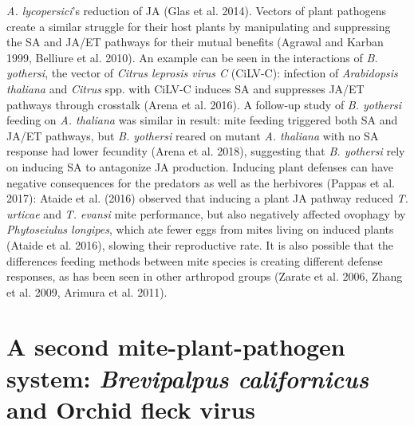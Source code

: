 \documentclass[12pt,final,CPage]{ufthesis}
\begin{document}
{\emph{A. lycopersici}'s reduction of JA (Glas et al. 2014). Vectors of plant pathogens create a similar struggle for their host plants by manipulating and suppressing the SA and JA/ET pathways for their mutual benefits (Agrawal and Karban 1999, Belliure et al. 2010). An example can be seen in the interactions of \emph{B. yothersi}, the vector of \emph{Citrus leprosis virus C} (CiLV-C): infection of \emph{Arabidopsis thaliana} and \emph{Citrus} spp. with CiLV-C induces SA and suppresses JA/ET pathways through crosstalk (Arena et al. 2016). A follow-up study of \emph{B. yothersi} feeding on \emph{A. thaliana} was similar in result: mite feeding triggered both SA and JA/ET pathways, but \emph{B. yothersi} reared on mutant \emph{A. thaliana} with no SA response had lower fecundity (Arena et al. 2018), suggesting that \emph{B. yothersi} rely on inducing SA to antagonize JA production. Inducing plant defenses can have negative consequences for the predators as well as the herbivores (Pappas et al. 2017): Ataide et al. (2016) observed that inducing a plant JA pathway reduced \emph{T. urticae} and \emph{T. evansi} mite performance, but also negatively affected ovophagy by \emph{Phytoseiulus longipes}, which ate fewer eggs from mites living on induced plants (Ataide et al. 2016), slowing their reproductive rate. It is also possible that the differences feeding methods between mite species is creating different defense responses, as has been seen in other arthropod groups (Zarate et al. 2006, Zhang et al. 2009, Arimura et al. 2011).

  \hypertarget{brevi-litrev}{%
  \section{\texorpdfstring{A second mite-plant-pathogen system: \emph{Brevipalpus californicus} and Orchid fleck virus}{A second mite-plant-pathogen system: Brevipalpus californicus and Orchid fleck virus}}\label{brevi-litrev}}

}
\end{document}
